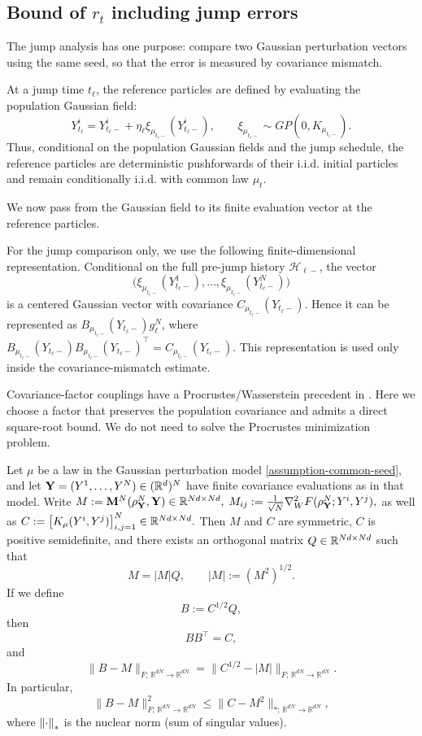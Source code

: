 \subsection{Bound of $r_t$ including jump errors}
\label{subsec:general-argument-r_t-jump-errors}

The jump analysis has one purpose: compare two Gaussian perturbation vectors
using the same seed, so that the error is measured by covariance mismatch.

At a jump time \(t_\ell\), the reference particles are defined by evaluating the
population Gaussian field:
\[
Y_{t_\ell}^i
=
Y_{t_\ell-}^i
+
\eta_\ell
\xi_{\mu_{t_\ell-}}(Y_{t_\ell-}^i),
\qquad
\xi_{\mu_{t_\ell-}}\sim GP(0,K_{\mu_{t_\ell-}}).
\]
Thus, conditional on the population Gaussian fields and the jump schedule,
the reference particles are deterministic pushforwards of their i.i.d. initial
particles and remain conditionally i.i.d. with common law \(\mu_t\).

We now pass from the Gaussian field to its finite evaluation vector at the
reference particles.

For the jump comparison only, we use the following finite-dimensional
representation. Conditional on the full pre-jump history \(\mathcal H_{\ell-}\), the vector
\[
\big(\xi_{\mu_{t_\ell-}}(Y_{t_\ell-}^1),\dots,
\xi_{\mu_{t_\ell-}}(Y_{t_\ell-}^N)\big)
\]
is a centered Gaussian vector with covariance
\(C_{\mu_{t_\ell-}}(Y_{t_\ell-})\). Hence it can be represented as
\(B_{\mu_{t_\ell-}}(Y_{t_\ell-})g_\ell^N\), where
\(B_{\mu_{t_\ell-}}(Y_{t_\ell-})B_{\mu_{t_\ell-}}(Y_{t_\ell-})^\top
= C_{\mu_{t_\ell-}}(Y_{t_\ell-})\).
This representation is used only inside the covariance-mismatch estimate.

Covariance-factor couplings have a Procrustes/Wasserstein precedent in
\citet{masarotto2019procrustes}. Here we choose a factor that preserves the
population covariance and admits a direct square-root bound. We do not
need to solve the Procrustes minimization problem.
\begin{lemma}
\label{lemma-aligned-finite-square-root}
Let $\mu$ be a law in the Gaussian perturbation model
\cref{assumption-common-seed}, and let
$\mathbf Y=(Y^1,\dots,Y^N)\in (\mathbb{R}^d)^N$ have finite covariance
evaluations as in that model. Write
$M:=\mathbf M^N(\rho_{\mathbf Y}^N,\mathbf Y)\in \mathbb{R}^{Nd\times Nd},\;
M_{ij}
:=
\frac1{\sqrt N}\nabla_W^2F(\rho_{\mathbf Y}^N;Y^i,Y^j),$
as well as
$
C:=\bigl[K_\mu(Y^i,Y^j)\bigr]_{i,j=1}^N\in \mathbb{R}^{Nd\times Nd}.
$
Then $M$ and $C$ are symmetric, $C$ is positive semidefinite, and there exists
an orthogonal matrix $Q\in\mathbb{R}^{Nd\times Nd}$ such that
\[
M=|M|Q,
\qquad
|M|:=(M^2)^{1/2}.
\]
If we define
\[
B:=C^{1/2}Q,
\]
then
\[
BB^\top=C,
\]
and
\[
\|B-M\|_{F;\,\mathbb R^{dN}\to\mathbb R^{dN}}=\|C^{1/2}-|M|\|_{F;\,\mathbb R^{dN}\to\mathbb R^{dN}}.
\]
In particular,
\[
\|B-M\|_{F;\,\mathbb R^{dN}\to\mathbb R^{dN}}^2
\le
\|C-M^2\|_{*;\,\mathbb R^{dN}\to\mathbb R^{dN}},
\]
where $\norm{\cdot}_*$ is the nuclear norm (sum of singular values).
\end{lemma}

